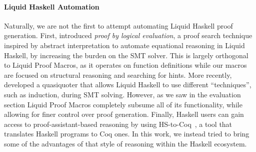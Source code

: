 \paragraph{Liquid Haskell Automation}
Naturally, we are not the first to attempt automating Liquid Haskell
proof generation.  First, \citet{VazouTCSNWJ18} introduced {\em proof
  by logical evaluation}, a proof search technique inspired by
abstract interpretation to automate equational reasoning in Liquid
Haskell, by increasing the burden on the SMT solver. This is largely
orthogonal to Liquid Proof Macros, as it operates on function
definitions while our macros are focused on structural reasoning and
searching for hints. More recently, \citet{TacticThesis} developed a
quasiquoter that allows Liquid Haskell to use different ``techniques'',
such as induction, during SMT solving. However, as we saw in the evaluation
section Liquid Proof Macros completely subsume all of its functionality,
while allowing for finer control over proof generation.
%
Finally, Haskell users can gain access to proof-assistant-based
reasoning by using HS-to-Coq~\cite{BreitnerSLRWCW21}, a tool that
translates Haskell programs to Coq ones. In this work, we instead
tried to bring some of the advantages of that style of reasoning
within the Haskell ecosystem.


%  


